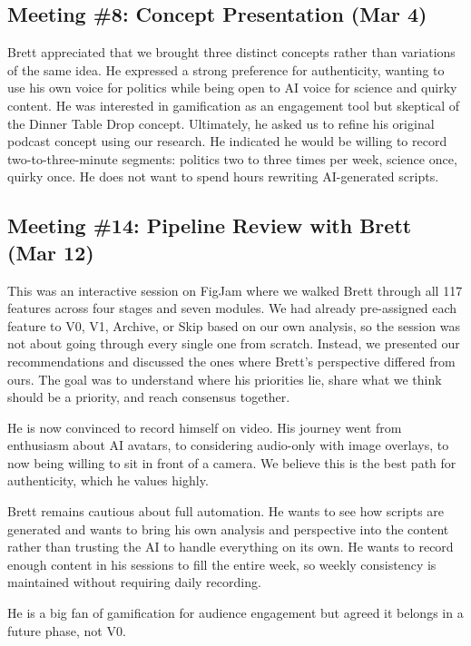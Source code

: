 \documentclass[11pt,a4paper]{article}
\begin{document}
\subsection{Meeting \#8: Concept Presentation (Mar 4)}

\begin{feedbackcard}
Brett appreciated that we brought three distinct concepts rather than variations of the same idea. He expressed a strong preference for authenticity, wanting to use his own voice for politics while being open to AI voice for science and quirky content. He was interested in gamification as an engagement tool but skeptical of the Dinner Table Drop concept. Ultimately, he asked us to refine his original podcast concept using our research. He indicated he would be willing to record two-to-three-minute segments: politics two to three times per week, science once, quirky once. He does not want to spend hours rewriting AI-generated scripts.
\end{feedbackcard}

\subsection{Meeting \#14: Pipeline Review with Brett (Mar 12)}

\begin{feedbackcard}
This was an interactive session on FigJam where we walked Brett through all 117 features across four stages and seven modules. We had already pre-assigned each feature to V0, V1, Archive, or Skip based on our own analysis, so the session was not about going through every single one from scratch. Instead, we presented our recommendations and discussed the ones where Brett's perspective differed from ours. The goal was to understand where his priorities lie, share what we think should be a priority, and reach consensus together.

He is now convinced to record himself on video. His journey went from enthusiasm about AI avatars, to considering audio-only with image overlays, to now being willing to sit in front of a camera. We believe this is the best path for authenticity, which he values highly.

Brett remains cautious about full automation. He wants to see how scripts are generated and wants to bring his own analysis and perspective into the content rather than trusting the AI to handle everything on its own. He wants to record enough content in his sessions to fill the entire week, so weekly consistency is maintained without requiring daily recording.

He is a big fan of gamification for audience engagement but agreed it belongs in a future phase, not V0.
\end{feedbackcard}
\end{document}
